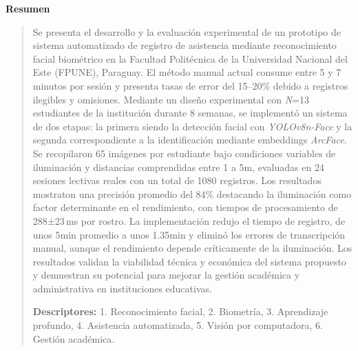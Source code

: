 \thispagestyle{empty}
\begin{center}
\begin{LARGE}
\textbf{Resumen}
\end{LARGE}
\end{center}
\begin{quotation}
\sloppy

Se presenta el desarrollo y la evaluación experimental de un prototipo de sistema automatizado de registro de asistencia mediante reconocimiento facial biométrico en la Facultad Politécnica de la Universidad Nacional del Este (FPUNE), Paraguay. El método manual actual consume entre 5 y 7 minutos por sesión y presenta tasas de error del 15–20\% debido a registros ilegibles y omisiones. Mediante un diseño experimental con \textit{N}=13 estudiantes de la institución durante 8 semanas, se implementó un sistema de dos etapas: la primera siendo la detección facial con \textit{YOLOv8n-Face} y la segunda correspondiente a la identificación mediante embeddings \textit{ArcFace}. Se recopilaron 65 imágenes por estudiante bajo condiciones variables de iluminación y distancias comprendidas entre 1 a 5m, evaluadas en 24 sesiones lectivas reales con un total de 1080 registros. Los resultados mostraton una precisión promedio del 84\% destacando la iluminación como factor determinante en el rendimiento, con tiempos de procesamiento de 288±23\,ms por rostro. La implementación redujo el tiempo de registro, de unos 5min promedio a unos 1.35min y eliminó los errores de transcripción manual, aunque el rendimiento depende críticamente de la iluminación. Los resultados validan la viabilidad técnica y económica del sistema propuesto y demuestran su potencial para mejorar la gestión académica y administrativa en instituciones educativas.

\vspace*{0.5cm}
\noindent \textbf{Descriptores:} 1. Reconocimiento facial, 2. Biometría, 3. Aprendizaje profundo, 4. Asistencia automatizada, 5. Visión por computadora, 6. Gestión académica.

\end{quotation}
